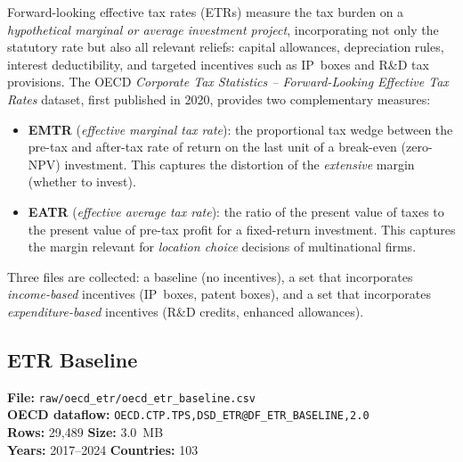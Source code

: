 \documentclass[11pt,a4paper]{article}
\begin{document}
Forward-looking effective tax rates (ETRs) measure the tax burden on a
\emph{hypothetical marginal or average investment project}, incorporating not
only the statutory rate but also all relevant reliefs: capital allowances,
depreciation rules, interest deductibility, and targeted incentives such as
IP~boxes and R\&D tax provisions.  The OECD \emph{Corporate Tax Statistics --
Forward-Looking Effective Tax Rates} dataset, first published in 2020, provides
two complementary measures:

\begin{itemize}[noitemsep]
    \item \textbf{EMTR} (\emph{effective marginal tax rate}): the proportional
    tax wedge between the pre-tax and after-tax rate of return on the last
    unit of a break-even (zero-NPV) investment.  This captures the distortion of
    the \emph{extensive} margin (whether to invest).
    \item \textbf{EATR} (\emph{effective average tax rate}): the ratio of the
    present value of taxes to the present value of pre-tax profit for a
    fixed-return investment.  This captures the margin relevant for \emph{location
    choice} decisions of multinational firms.
\end{itemize}

Three files are collected: a baseline (no incentives), a set that incorporates
\emph{income-based} incentives (IP~boxes, patent boxes), and a set that
incorporates \emph{expenditure-based} incentives (R\&D credits, enhanced
allowances).

\subsection{ETR Baseline}
\label{subsec:etr_baseline}

\textbf{File:} \texttt{raw/oecd\_etr/oecd\_etr\_baseline.csv}\\
\textbf{OECD dataflow:} \texttt{OECD.CTP.TPS,DSD\_ETR@DF\_ETR\_BASELINE,2.0}\\
\textbf{Rows:} 29{,}489 \quad \textbf{Size:} 3.0~MB\\
\textbf{Years:} 2017--2024 \quad \textbf{Countries:} 103
\end{document}
